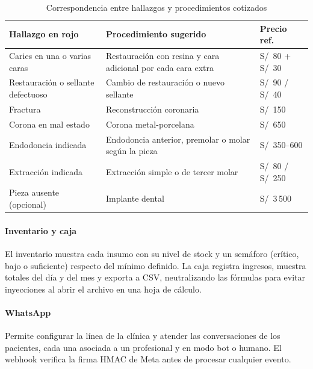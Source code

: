 \documentclass[11pt]{article}
\begin{document}
\begin{table}[H]
\centering\small
\caption{Correspondencia entre hallazgos y procedimientos cotizados}\label{tab:cotizacion}
\begin{tabularx}{\linewidth}{@{}P{4.6cm}LP{2.2cm}@{}}
\toprule
\textbf{Hallazgo en rojo} & \textbf{Procedimiento sugerido} & \textbf{Precio ref.} \\
\midrule
Caries en una o varias caras & Restauración con resina y cara adicional por cada cara extra & S/~80 + S/~30 \\
Restauración o sellante defectuoso & Cambio de restauración o nuevo sellante & S/~90 / S/~40 \\
Fractura & Reconstrucción coronaria & S/~150 \\
Corona en mal estado & Corona metal-porcelana & S/~650 \\
Endodoncia indicada & Endodoncia anterior, premolar o molar según la pieza & S/~350--600 \\
Extracción indicada & Extracción simple o de tercer molar & S/~80 / S/~250 \\
Pieza ausente (opcional) & Implante dental & S/~3\,500 \\
\bottomrule
\end{tabularx}
\end{table}


\paragraph{Inventario y caja} El inventario muestra cada insumo con su nivel de stock y un semáforo (crítico, bajo o suficiente) respecto del mínimo definido. La caja registra ingresos, muestra totales del día y del mes y exporta a CSV, neutralizando las fórmulas para evitar inyecciones al abrir el archivo en una hoja de cálculo.


\paragraph{WhatsApp} Permite configurar la línea de la clínica y atender las conversaciones de los pacientes, cada una asociada a un profesional y en modo bot o humano. El webhook verifica la firma HMAC de Meta antes de procesar cualquier evento.
\end{document}
